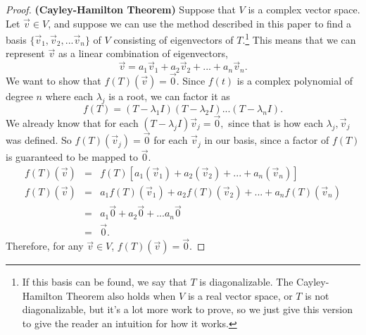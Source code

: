 \documentclass[letterpaper]{article}
\begin{document}
\begin{proof}
\textbf{(Cayley-Hamilton Theorem)}
Suppose that $V$ is a complex vector space. Let $\vec{v} \in V$, and suppose we can use the method described in this paper to find a basis $\{\vec{v}_1, \vec{v}_2, ... \vec{v}_n\}$ of $V$ consisting of eigenvectors of $T$.\footnote{If this basis can be found, we say that $T$ is diagonalizable. The Cayley-Hamilton Theorem also holds when $V$ is a real vector space, or $T$ is not diagonalizable, but it's a lot more work to prove, so we just give this version to give the reader an intuition for how it works.} This means that we can represent $\vec{v}$ as a linear combination of eigenvectors,
$$\vec{v} = a_1\vec{v}_1 + a_2\vec{v}_2 + ... + a_n\vec{v}_n.$$
We want to show that $f(T)(\vec{v}) = \vec{0}$. Since $f(t)$ is a complex polynomial of degree $n$ where each $\lambda_j$ is a root, we can factor it as 
$$f(T) = (T-\lambda_1 I)(T-\lambda_2 I)...(T-\lambda_n I).$$
We already know that for each $(T-\lambda_j I)\vec{v}_j=\vec{0},$ since that is how each $\lambda_j, \vec{v}_j$ was defined. So $f(T)(\vec{v}_j) = \vec{0}$ for each $\vec{v}_j$ in our basis, since a factor of $f(T)$ is guaranteed to be mapped to $\vec{0}$. 
\[
\begin{array}{rcl}
f(T)(\vec{v}) &=& f(T)[a_1(\vec{v}_1) + a_2(\vec{v}_2) + ... + a_n(\vec{v}_n)] \\
f(T)(\vec{v}) &=& a_1f(T)(\vec{v}_1) + a_2f(T)(\vec{v}_2) + ... + a_nf(T)(\vec{v}_n) \\ 
&=& a_1\vec{0} + a_2\vec{0} + ... a_n\vec{0}\\
&=& \vec{0}.
\end{array}
\]
Therefore, for any $\vec{v} \in V$, $f(T)(\vec{v})=\vec{0}$.

\end{proof}
\end{document}
